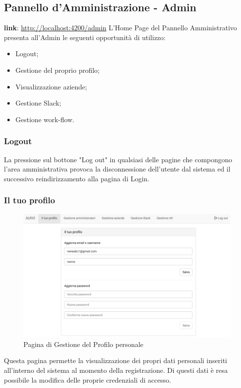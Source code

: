 \documentclass[../ManualeUtente_v2.0.0.tex]{subfiles}
\begin{document}
	\subsection{Pannello d'Amministrazione - Admin}
	\textbf{link}: \url{http://localhost:4200/admin}
	\newline
	\newline
	L'Home Page del Pannello Amministrativo presenta all'Admin le seguenti opportunità di utilizzo:
	\begin{itemize}
		\item{Logout};
		\item{Gestione del proprio profilo};
		\item{Visualizzazione aziende};
		\item{Gestione Slack};
		\item{Gestione work-flow}.
	\end{itemize}
	
	\subsubsection{Logout}
	La pressione sul bottone "Log out" in qualsiasi delle pagine che compongono l'area amministrativa provoca la disconnessione dell'utente dal sistema ed il successivo reindirizzamento alla pagina di Login.
	
	\subsubsection{Il tuo profilo}
	\begin{figure}[!h]
		\centering
		\includegraphics[scale=0.25]{Screenshot/admin-manageProfile.png}
		\caption{Pagina di Gestione del Profilo personale}
	\end{figure}
	Questa pagina permette la visualizzazione dei propri dati personali inseriti all'interno del sistema al momento della registrazione. Di questi dati è resa possibile la modifica delle proprie credenziali di accesso.
	
\end{document}
